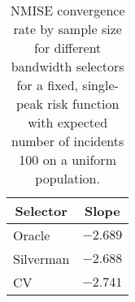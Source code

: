 \begin{table}[htbp]
\begin{center}
\begin{tabular}{lr}
\toprule
\multicolumn{1}{c}{Selector}&\multicolumn{1}{c}{Slope}\tabularnewline
\midrule
Oracle&$-2.689$\tabularnewline
Silverman&$-2.688$\tabularnewline
CV&$-2.741$\tabularnewline
\bottomrule
\end{tabular}
\caption[NMISE Convergence rate by sample size]{NMISE convergence rate by sample size for different bandwidth selectors for a fixed, single-peak risk function with expected number of incidents 100 on a uniform population.\label{tab:results:nmise_convergence_by_sample_size}}\end{center}
\end{table}
